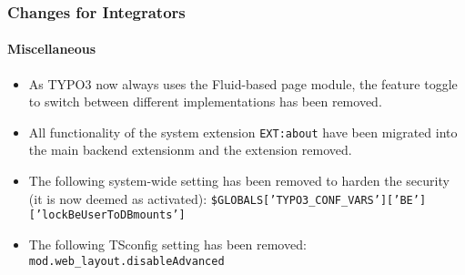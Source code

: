 %

\begin{frame}[fragile]
	\frametitle{Changes for Integrators}
	\framesubtitle{Miscellaneous}

	\begin{itemize}
		\item As TYPO3 now always uses the Fluid-based page module, the feature
			toggle to switch between different implementations has been removed.
		\item All functionality of the system extension \texttt{EXT:about}
			have been migrated into the main backend extensionm and the
			extension removed.
		\item The following system-wide setting has been removed to harden the security
			(it is now deemed as activated):\newline
			\smaller\texttt{\$GLOBALS['TYPO3\_CONF\_VARS']['BE']['lockBeUserToDBmounts']}\normalsize
		\item The following TSconfig setting has been removed:\newline
			\smaller\texttt{mod.web\_layout.disableAdvanced}\normalsize
	\end{itemize}

\end{frame}

